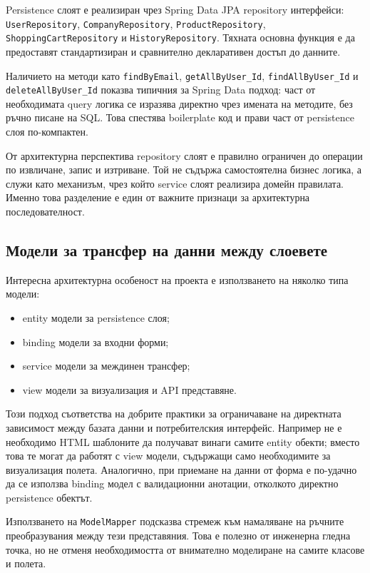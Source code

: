Persistence слоят е реализиран чрез Spring Data JPA repository интерфейси: \texttt{UserRepository}, \texttt{CompanyRepository}, \texttt{ProductRepository}, \texttt{ShoppingCartRepository} и \texttt{HistoryRepository}. Тяхната основна функция е да предоставят стандартизиран и сравнително декларативен достъп до данните.

Наличието на методи като \texttt{findByEmail}, \texttt{getAllByUser\_Id}, \texttt{findAllByUser\_Id} и \texttt{deleteAllByUser\_Id} показва типичния за Spring Data подход: част от необходимата query логика се изразява директно чрез имената на методите, без ръчно писане на SQL. Това спестява boilerplate код и прави част от persistence слоя по-компактен.

От архитектурна перспектива repository слоят е правилно ограничен до операции по извличане, запис и изтриване. Той не съдържа самостоятелна бизнес логика, а служи като механизъм, чрез който service слоят реализира домейн правилата. Именно това разделение е един от важните признаци за архитектурна последователност.

\subsection{Модели за трансфер на данни между слоевете}

Интересна архитектурна особеност на проекта е използването на няколко типа модели:

\begin{itemize}[leftmargin=*]
    \item entity модели за persistence слоя;
    \item binding модели за входни форми;
    \item service модели за междинен трансфер;
    \item view модели за визуализация и API представяне.
\end{itemize}

Този подход съответства на добрите практики за ограничаване на директната зависимост между базата данни и потребителския интерфейс. Например не е необходимо HTML шаблоните да получават винаги самите entity обекти; вместо това те могат да работят с view модели, съдържащи само необходимите за визуализация полета. Аналогично, при приемане на данни от форма е по-удачно да се използва binding модел с валидационни анотации, отколкото директно persistence обектът.

Използването на \texttt{ModelMapper} подсказва стремеж към намаляване на ръчните преобразувания между тези представяния. Това е полезно от инженерна гледна точка, но не отменя необходимостта от внимателно моделиране на самите класове и полета.


